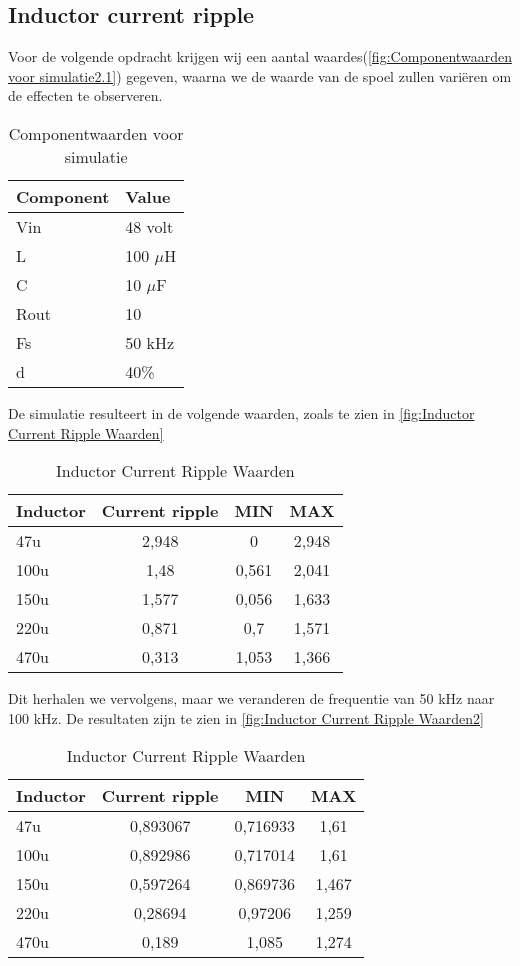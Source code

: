 \subsection{Inductor current ripple}
Voor de volgende opdracht krijgen wij een aantal waardes(\autoref{fig:Componentwaarden voor simulatie2.1}) gegeven, waarna we de waarde van de spoel zullen variëren om de effecten te observeren.
\begin{table}[h!]
\centering
\begin{tabular}{|l|l|}
\hline
\textbf{Component} & \textbf{Value} \\
\hline
Vin  & 48 volt \\
L    & 100 $\mu$H \\
C    & 10 $\mu$F \\
Rout & 10 \\
Fs   & 50 kHz \\
d    & 40\% \\
\hline
\end{tabular}
\caption{Componentwaarden voor simulatie}
\label{fig:Componentwaarden voor simulatie2.1}
\end{table}
De simulatie resulteert in de volgende waarden, zoals te zien in \autoref{fig:Inductor Current Ripple Waarden}
\begin{table}[h!]
\centering
\begin{tabular}{|l|c|c|c|}
\hline
\textbf{Inductor} & \textbf{Current ripple} & \textbf{MIN} & \textbf{MAX} \\
\hline
47u  & 2,948  & 0     & 2,948 \\
100u & 1,48   & 0,561 & 2,041 \\
150u & 1,577  & 0,056 & 1,633 \\
220u & 0,871  & 0,7   & 1,571 \\
470u & 0,313  & 1,053 & 1,366 \\
\hline
\end{tabular}
\caption{Inductor Current Ripple Waarden}
\label{fig:Inductor Current Ripple Waarden}
\end{table}
Dit herhalen we vervolgens, maar we veranderen de frequentie van 50 kHz naar 100 kHz. De resultaten zijn te zien in \autoref{fig:Inductor Current Ripple Waarden2}
\begin{table}[h!]
\centering
\begin{tabular}{|l|c|c|c|}
\hline
\textbf{Inductor} & \textbf{Current ripple} & \textbf{MIN} & \textbf{MAX} \\
\hline
47u  & 0,893067  & 0,716933  & 1,61 \\
100u & 0,892986  & 0,717014  & 1,61 \\
150u & 0,597264  & 0,869736  & 1,467 \\
220u & 0,28694   & 0,97206   & 1,259 \\
470u & 0,189     & 1,085     & 1,274 \\
\hline
\end{tabular}
\caption{Inductor Current Ripple Waarden}
\label{fig:Inductor Current Ripple Waarden2}
\end{table}